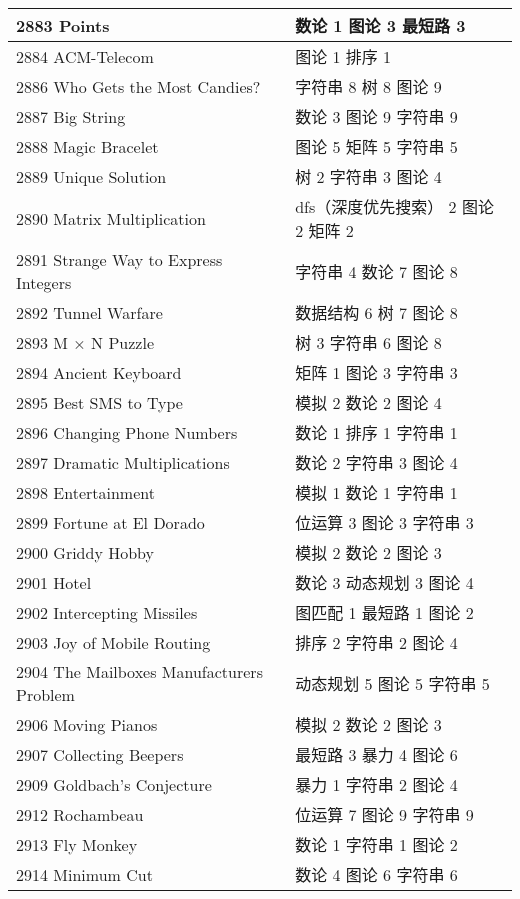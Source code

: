 \begin{longtable}{| p{} | p{} |}
 2883 Points  & 数论 1 图论 3 最短路 3 \\ \hline
 2884 ACM-Telecom  & 图论 1 排序 1 \\ \hline
 2886 Who Gets the Most Candies?  & 字符串 8 树 8 图论 9 \\ \hline
 2887 Big String  & 数论 3 图论 9 字符串 9 \\ \hline
 2888 Magic Bracelet  & 图论 5 矩阵 5 字符串 5 \\ \hline
 2889 Unique Solution  & 树 2 字符串 3 图论 4 \\ \hline
 2890 Matrix Multiplication  & dfs（深度优先搜索） 2 图论 2 矩阵 2 \\ \hline
 2891 Strange Way to Express Integers  & 字符串 4 数论 7 图论 8 \\ \hline
 2892 Tunnel Warfare  & 数据结构 6 树 7 图论 8 \\ \hline
 2893 M × N Puzzle  & 树 3 字符串 6 图论 8 \\ \hline
 2894 Ancient Keyboard  & 矩阵 1 图论 3 字符串 3 \\ \hline
 2895 Best SMS to Type  & 模拟 2 数论 2 图论 4 \\ \hline
 2896 Changing Phone Numbers  & 数论 1 排序 1 字符串 1 \\ \hline
 2897 Dramatic Multiplications  & 数论 2 字符串 3 图论 4 \\ \hline
 2898 Entertainment  & 模拟 1 数论 1 字符串 1 \\ \hline
 2899 Fortune at El Dorado  & 位运算 3 图论 3 字符串 3 \\ \hline
 2900 Griddy Hobby  & 模拟 2 数论 2 图论 3 \\ \hline
 2901 Hotel  & 数论 3 动态规划 3 图论 4 \\ \hline
 2902 Intercepting Missiles  & 图匹配 1 最短路 1 图论 2 \\ \hline
 2903 Joy of Mobile Routing  & 排序 2 字符串 2 图论 4 \\ \hline
 2904 The Mailboxes Manufacturers Problem  & 动态规划 5 图论 5 字符串 5 \\ \hline
 2906 Moving Pianos  & 模拟 2 数论 2 图论 3 \\ \hline
 2907 Collecting Beepers  & 最短路 3 暴力 4 图论 6 \\ \hline
 2909 Goldbach's Conjecture  & 暴力 1 字符串 2 图论 4 \\ \hline
 2912 Rochambeau  & 位运算 7 图论 9 字符串 9 \\ \hline
 2913 Fly Monkey  & 数论 1 字符串 1 图论 2 \\ \hline
 2914 Minimum Cut  & 数论 4 图论 6 字符串 6 \\ \hline

\end{longtable}
